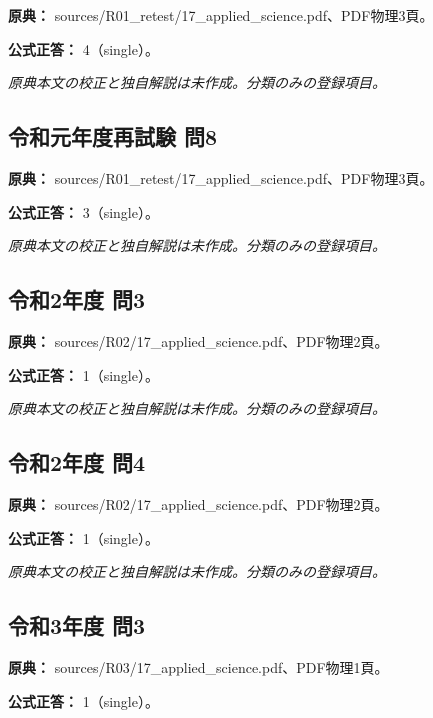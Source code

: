 \noindent\textbf{原典：} sources/R01\_retest/17\_applied\_science.pdf、PDF物理3頁。

\textbf{公式正答：} 4（single）。

\par\textit{原典本文の校正と独自解説は未作成。分類のみの登録項目。}

\subsection{令和元年度再試験 問8}
\label{q:r01-ret-applied-08}

\noindent\textbf{原典：} sources/R01\_retest/17\_applied\_science.pdf、PDF物理3頁。

\textbf{公式正答：} 3（single）。

\par\textit{原典本文の校正と独自解説は未作成。分類のみの登録項目。}

\subsection{令和2年度 問3}
\label{q:r02-reg-applied-03}

\noindent\textbf{原典：} sources/R02/17\_applied\_science.pdf、PDF物理2頁。

\textbf{公式正答：} 1（single）。

\par\textit{原典本文の校正と独自解説は未作成。分類のみの登録項目。}

\subsection{令和2年度 問4}
\label{q:r02-reg-applied-04}

\noindent\textbf{原典：} sources/R02/17\_applied\_science.pdf、PDF物理2頁。

\textbf{公式正答：} 1（single）。

\par\textit{原典本文の校正と独自解説は未作成。分類のみの登録項目。}

\subsection{令和3年度 問3}
\label{q:r03-reg-applied-03}

\noindent\textbf{原典：} sources/R03/17\_applied\_science.pdf、PDF物理1頁。

\textbf{公式正答：} 1（single）。

